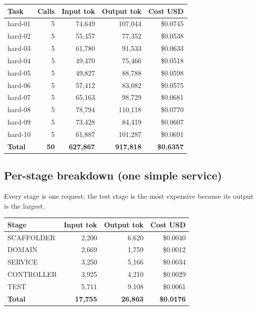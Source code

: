 \documentclass[11pt,a4paper]{article}
\begin{document}
\begin{center}
\begin{tabular}{@{}lrrrr@{}}
\toprule
\textbf{Task} & \textbf{Calls} & \textbf{Input tok} & \textbf{Output tok} & \textbf{Cost USD} \\
\midrule
hard-01 & 5 & 74{,}649 & 107{,}044 & \$0.0745 \\
hard-02 & 5 & 55{,}457 & 77{,}352 & \$0.0538 \\
hard-03 & 5 & 61{,}780 & 91{,}533 & \$0.0633 \\
hard-04 & 5 & 49{,}470 & 75{,}466 & \$0.0518 \\
hard-05 & 5 & 49{,}827 & 88{,}788 & \$0.0598 \\
hard-06 & 5 & 57{,}412 & 83{,}082 & \$0.0575 \\
hard-07 & 5 & 65{,}163 & 98{,}729 & \$0.0681 \\
hard-08 & 5 & 78{,}794 & 110{,}118 & \$0.0770 \\
hard-09 & 5 & 73{,}428 & 84{,}419 & \$0.0607 \\
hard-10 & 5 & 61{,}887 & 101{,}287 & \$0.0691 \\
\midrule
\textbf{Total} & \textbf{50} & \textbf{627{,}867} & \textbf{917{,}818} & \textbf{\$0.6357} \\
\bottomrule
\end{tabular}
\end{center}

\subsection{Per-stage breakdown (one simple service)}

Every stage is one request; the test stage is the most expensive because its output
is the largest.

\begin{center}
\begin{tabular}{@{}lrrr@{}}
\toprule
\textbf{Stage} & \textbf{Input tok} & \textbf{Output tok} & \textbf{Cost USD} \\
\midrule
SCAFFOLDER & 2{,}200 & 6{,}620 & \$0.0040 \\
DOMAIN & 2{,}669 & 1{,}759 & \$0.0012 \\
SERVICE & 3{,}250 & 5{,}166 & \$0.0034 \\
CONTROLLER & 3{,}925 & 4{,}210 & \$0.0029 \\
TEST & 5{,}711 & 9{,}108 & \$0.0061 \\
\midrule
\textbf{Total} & \textbf{17{,}755} & \textbf{26{,}863} & \textbf{\$0.0176} \\
\bottomrule
\end{tabular}
\end{center}
\end{document}
